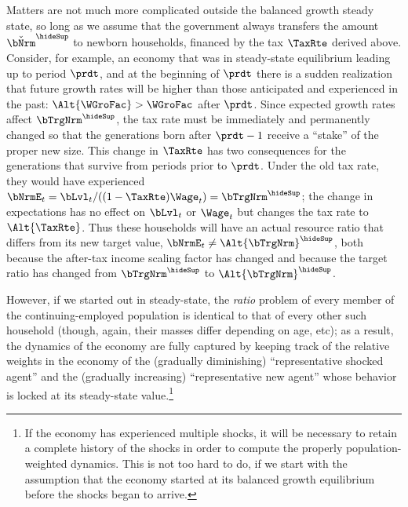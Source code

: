 \documentclass{econark}
\begin{document}
Matters are not much more complicated outside the balanced growth
steady state, so long as we assume that the government always
transfers the amount $\check{\bNrm}^{\hideSup}$ to newborn households, financed by
the tax $\TaxRte$ derived above.  Consider, for example, an economy that
was in steady-state equilibrium leading up to period $\prdt$, and at
the beginning of $\prdt$ there is a sudden realization that future
growth rates will be higher than those anticipated and experienced in
the past: $\Alt{\WGroFac} > \WGroFac$ after $\prdt$.  Since expected
growth rates affect $\bTrgNrm^{\hideSup}$, the tax rate must be immediately and
permanently changed so that the generations born after $\prdt-1$
receive a ``stake'' of the proper new size.  This change in $\TaxRte$ has
two consequences for the generations that survive from periods prior
to $\prdt$.  Under the old tax rate, they would have experienced
$\bNrmE_{t} = \bLvl_{t}/((1-\TaxRte)\Wage_{t}) = \bTrgNrm^{\hideSup}$; the change in
expectations has no effect on $\bLvl_{t}$ or $\Wage_{t}$ but changes
the tax rate to $\Alt{\TaxRte}$.  Thus these households will have an
actual resource ratio that differs from its new target value, $\bNrmE_{t}
\neq \Alt{\bTrgNrm}^{\hideSup}$, both because the after-tax income scaling factor
has changed and because the target ratio has changed from $\bTrgNrm^{\hideSup}$
to $\Alt{\bTrgNrm}^{\hideSup}$.

However, if we started out in steady-state, the {\it ratio} problem of every
member of the continuing-employed population is identical to that of every 
other such household (though, again, their masses differ depending on age, etc); as a result, the dynamics of the economy are fully captured
by keeping track of the relative weights in the economy of the (gradually diminishing) ``representative shocked agent'' and the (gradually increasing) ``representative new agent'' 
whose behavior is locked at its steady-state value.\footnote{
If the economy has experienced multiple shocks, it will be necessary to
retain a complete history of the shocks in order to compute the properly 
population-weighted dynamics.  This is not too hard to do, if we start with
the assumption that the economy started at its balanced growth equilibrium before the shocks began to arrive.}
\end{document}
